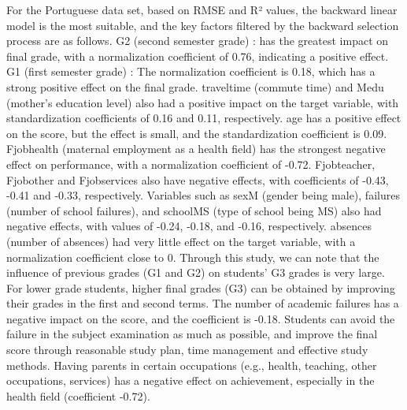 \documentclass[letterpaper,9pt,twocolumn,twoside,]{pinp}
\begin{document}
For the Portuguese data set, based on RMSE and R² values, the backward
linear model is the most suitable, and the key factors filtered by the
backward selection process are as follows. G2 (second semester grade) :
has the greatest impact on final grade, with a normalization coefficient
of 0.76, indicating a positive effect. G1 (first semester grade) : The
normalization coefficient is 0.18, which has a strong positive effect on
the final grade. traveltime (commute time) and Medu (mother's education
level) also had a positive impact on the target variable, with
standardization coefficients of 0.16 and 0.11, respectively. age has a
positive effect on the score, but the effect is small, and the
standardization coefficient is 0.09. Fjobhealth (maternal employment as
a health field) has the strongest negative effect on performance, with a
normalization coefficient of -0.72. Fjobteacher, Fjobother and
Fjobservices also have negative effects, with coefficients of -0.43,
-0.41 and -0.33, respectively. Variables such as sexM (gender being
male), failures (number of school failures), and schoolMS (type of
school being MS) also had negative effects, with values of -0.24, -0.18,
and -0.16, respectively. absences (number of absences) had very little
effect on the target variable, with a normalization coefficient close to
0. Through this study, we can note that the influence of previous grades
(G1 and G2) on students' G3 grades is very large. For lower grade
students, higher final grades (G3) can be obtained by improving their
grades in the first and second terms. The number of academic failures
has a negative impact on the score, and the coefficient is -0.18.
Students can avoid the failure in the subject examination as much as
possible, and improve the final score through reasonable study plan,
time management and effective study methods. Having parents in certain
occupations (e.g., health, teaching, other occupations, services) has a
negative effect on achievement, especially in the health field
(coefficient -0.72).
\end{document}
